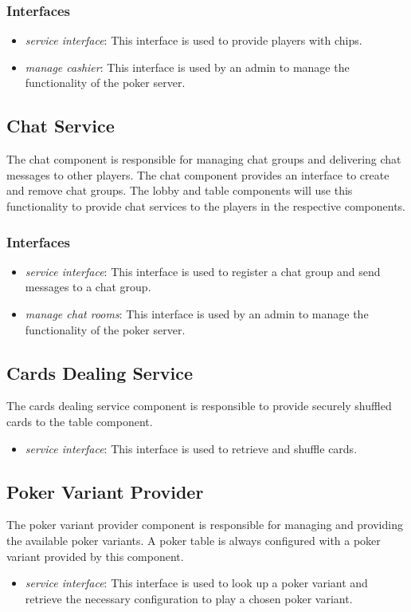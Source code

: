 \documentclass[a4paper,11pt]{report}
\begin{document}
\subsubsection{Interfaces}
\begin{itemize}
\item \emph{service interface}: This interface is used to provide players with chips. 
\item \emph{manage cashier}: This interface is used by an admin to manage the functionality of the poker server.
\end{itemize}

\subsection{Chat Service}
The chat component is responsible for managing chat groups and delivering chat messages to other players. The chat component provides an interface to create and remove chat groups. The lobby and table components will use this functionality to provide chat services to the players in the respective components.
\subsubsection{Interfaces}
\begin{itemize}
\item \emph{service interface}: This interface is used to register a chat group and send messages to a chat group.
\item \emph{manage chat rooms}: This interface is used by an admin to manage the functionality of the poker server.
\end{itemize}

\subsection{Cards Dealing Service}
The cards dealing service component is responsible to provide securely shuffled cards to the table component.
\begin{itemize}
\item \emph{service interface}: This interface is used to retrieve and shuffle cards.
\end{itemize}

\subsection{Poker Variant Provider}
The poker variant provider component is responsible for managing and providing the available poker variants. A  poker table is always configured with a poker variant provided by this component.
\begin{itemize}
\item \emph{service interface}: This interface is used to look up a poker variant and retrieve the necessary configuration to play a chosen poker variant.
\end{itemize}
\end{document}
